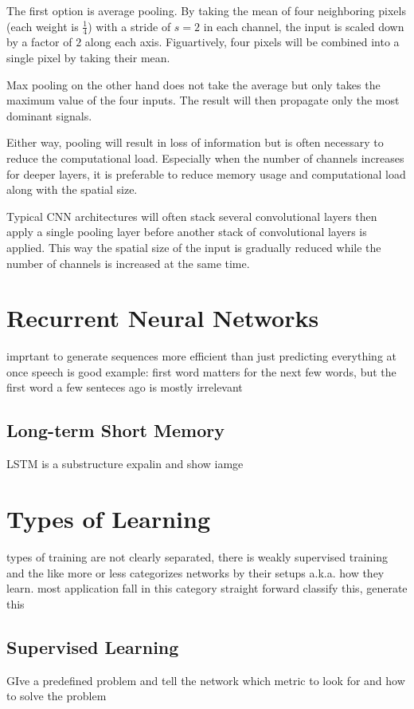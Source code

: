 The first option is average pooling.
By taking the mean of four neighboring pixels (each weight is $\frac{1}{4}$) with a stride of $s = 2$ in each channel, the input is scaled down by a factor of $2$ along each axis.
Figuartively, four pixels will be combined into a single pixel by taking their mean.

Max pooling on the other hand does not take the average but only takes the maximum value of the four inputs.
The result will then propagate only the most dominant signals.

Either way, pooling will result in loss of information but is often necessary to reduce the computational load.
Especially when the number of channels increases for deeper layers, it is preferable to reduce memory usage and computational load along with the spatial size.

Typical CNN architectures will often stack several convolutional layers then apply a single pooling layer before another stack of convolutional layers is applied.
This way the spatial size of the input is gradually reduced while the number of channels is increased at the same time.
 

\section{Recurrent Neural Networks}
imprtant to generate sequences
more efficient than just predicting everything at once
speech is good example: first word matters for the next few words, but the first word a few senteces ago is mostly irrelevant
\subsection{Long-term Short Memory}
LSTM is a substructure
expalin and show iamge


\section{Types of Learning}
types of training are not clearly separated, there is weakly supervised training and the like
more or less categorizes networks by their setups a.k.a. how they learn.
most application fall in this category
straight forward
classify this, generate this

\subsection{Supervised Learning}
GIve a predefined problem and tell the network which metric to look for and how to solve the problem

